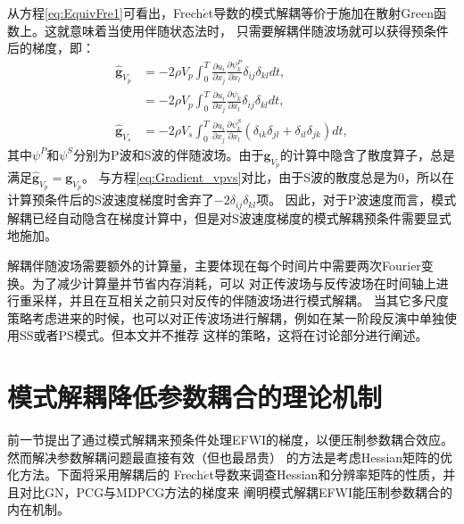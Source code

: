 从方程\eqref{eq:EquivFre1}可看出，Frech$\acute{e}$t导数的模式解耦等价于施加在散射Green函数上。这就意味着当使用伴随状态法时，
只需要解耦伴随波场就可以获得预条件后的梯度，即：
\begin{equation} 
        \begin{split} 
                \hat{\mathbf{g}}_{V_p}&=-2\rho V_p\int_{0}^{T}\frac{\partial u_i}{\partial
        x_j}\frac{\partial \psi^P_k}{\partial x_l}
        \delta_{ij}\delta_{kl}dt,\\
        &=-2\rho V_p\int_{0}^{T}\frac{\partial u_i}{\partial
        x_j}\frac{\partial \psi_k}{\partial x_l}
        \delta_{ij}\delta_{kl}dt,\\
                \hat{\mathbf{g}}_{V_s}&=-2\rho V_s\int_{0}^{T}\frac{\partial u_i}{\partial
        x_j}\frac{\partial \psi^S_k}{\partial x_l}
        (\delta_{ik}\delta_{jl}+\delta_{il}\delta_{jk})dt,
        \end{split}
        \label{eq:DeGradient_vpvs} 
\end{equation}
其中$\psi^P$和$\psi^S$分别为P波和S波的伴随波场。由于$\mathbf{g}_{V_p}$的计算中隐含了散度算子，总是满足$\hat{\mathbf{g}}_{V_p}=\mathbf{g}_{V_p}$。
与方程\eqref{eq:Gradient_vpvs}对比，由于S波的散度总是为0，所以在计算预条件后的S波速度梯度时舍弃了$-2\delta_{ij}\delta_{kl}$项。
因此，对于P波速度而言，模式解耦已经自动隐含在梯度计算中，但是对S波速度梯度的模式解耦预条件需要显式地施加。

解耦伴随波场需要额外的计算量，主要体现在每个时间片中需要两次Fourier变换。为了减少计算量并节省内存消耗，可以
对正传波场与反传波场在时间轴上进行重采样，并且在互相关之前只对反传的伴随波场进行模式解耦。
当其它多尺度策略考虑进来的时候，也可以对正传波场进行解耦，例如在某一阶段反演中单独使用SS或者PS模式。但本文并不推荐
这样的策略，这将在讨论部分进行阐述。
\section{模式解耦降低参数耦合的理论机制}
	前一节提出了通过模式解耦来预条件处理EFWI的梯度，以便压制参数耦合效应。然而解决参数解耦问题最直接有效（但也最昂贵）
的方法是考虑Hessian矩阵的优化方法。下面将采用解耦后的
Frech$\acute{e}$t导数来调查Hessian和分辨率矩阵的性质，并且对比GN，PCG与MDPCG方法的梯度来
阐明模式解耦EFWI能压制参数耦合的内在机制。
